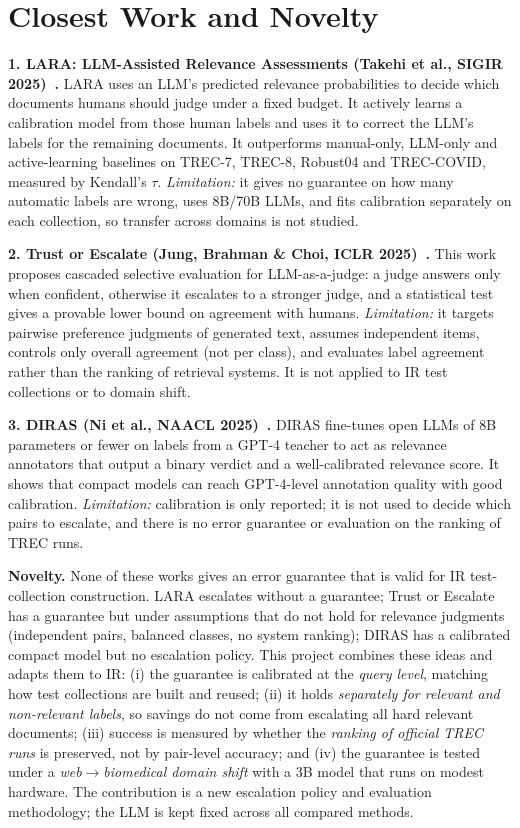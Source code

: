 \documentclass[11pt,a4paper]{article}
\begin{document}
\section{Closest Work and Novelty}

\textbf{1. LARA: LLM-Assisted Relevance Assessments (Takehi et al., SIGIR 2025)~\cite{lara2025}.}
LARA uses an LLM's predicted relevance probabilities to decide which documents humans should judge under a fixed budget. It actively learns a calibration model from those human labels and uses it to correct the LLM's labels for the remaining documents. It outperforms manual-only, LLM-only and active-learning baselines on TREC-7, TREC-8, Robust04 and TREC-COVID, measured by Kendall's $\tau$. \emph{Limitation:} it gives no guarantee on how many automatic labels are wrong, uses 8B/70B LLMs, and fits calibration separately on each collection, so transfer across domains is not studied.

\textbf{2. Trust or Escalate (Jung, Brahman \& Choi, ICLR 2025)~\cite{jung2025}.}
This work proposes cascaded selective evaluation for LLM-as-a-judge: a judge answers only when confident, otherwise it escalates to a stronger judge, and a statistical test gives a provable lower bound on agreement with humans. \emph{Limitation:} it targets pairwise preference judgments of generated text, assumes independent items, controls only overall agreement (not per class), and evaluates label agreement rather than the ranking of retrieval systems. It is not applied to IR test collections or to domain shift.

\textbf{3. DIRAS (Ni et al., NAACL 2025)~\cite{diras2025}.}
DIRAS fine-tunes open LLMs of 8B parameters or fewer on labels from a GPT-4 teacher to act as relevance annotators that output a binary verdict and a well-calibrated relevance score. It shows that compact models can reach GPT-4-level annotation quality with good calibration. \emph{Limitation:} calibration is only reported; it is not used to decide which pairs to escalate, and there is no error guarantee or evaluation on the ranking of TREC runs.

\textbf{Novelty.}
None of these works gives an error guarantee that is valid for IR test-collection construction. LARA escalates without a guarantee; Trust or Escalate has a guarantee but under assumptions that do not hold for relevance judgments (independent pairs, balanced classes, no system ranking); DIRAS has a calibrated compact model but no escalation policy. This project combines these ideas and adapts them to IR: (i) the guarantee is calibrated at the \emph{query level}, matching how test collections are built and reused; (ii) it holds \emph{separately for relevant and non-relevant labels}, so savings do not come from escalating all hard relevant documents; (iii) success is measured by whether the \emph{ranking of official TREC runs} is preserved, not by pair-level accuracy; and (iv) the guarantee is tested under a \emph{web$\rightarrow$biomedical domain shift} with a 3B model that runs on modest hardware. The contribution is a new escalation policy and evaluation methodology; the LLM is kept fixed across all compared methods.
\end{document}
